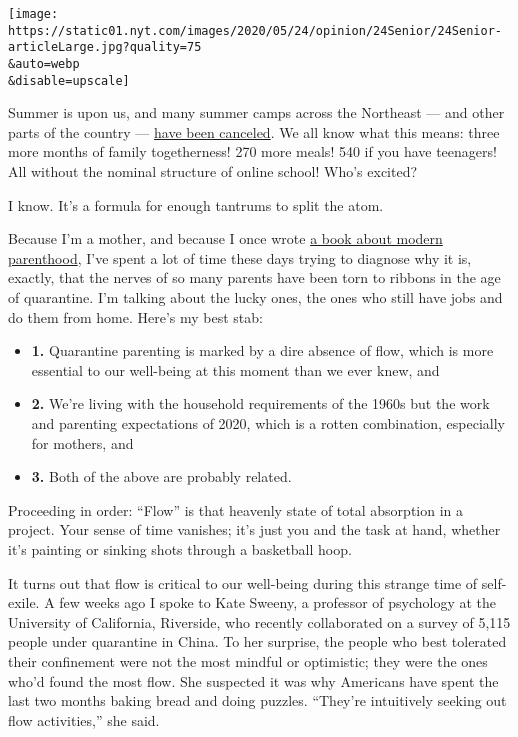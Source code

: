 \texttt{[image: https://static01.nyt.com/images/2020/05/24/opinion/24Senior/24Senior-articleLarge.jpg?quality=75\\\&auto=webp\\\&disable=upscale]}

Summer is upon us, and many summer camps across the Northeast --- and
other parts of the country ---
\href{https://www.nytimes.com/2020/05/22/nyregion/summer-camp-coronavirus.html?searchResultPosition=1}{have
been canceled}. We all know what this means: three more months of family
togetherness! 270 more meals! 540 if you have teenagers! All without the
nominal structure of online school! Who's excited?

I know. It's a formula for enough tantrums to split the atom.

Because I'm a mother, and because I once wrote
\href{https://www.nytimes.com/2014/02/02/books/review/all-joy-and-no-fun-by-jennifer-senior.html}{a
book about modern parenthood}, I've spent a lot of time these days
trying to diagnose why it is, exactly, that the nerves of so many
parents have been torn to ribbons in the age of quarantine. I'm talking
about the lucky ones, the ones who still have jobs and do them from
home. Here's my best stab:

\begin{itemize}
\item
  \textbf{1.} Quarantine parenting is marked by a dire absence of flow,
  which is more essential to our well-being at this moment than we ever
  knew, and
\item
  \textbf{2.} We're living with the household requirements of the 1960s
  but the work and parenting expectations of 2020, which is a rotten
  combination, especially for mothers, and
\item
  \textbf{3.} Both of the above are probably related.
\end{itemize}

Proceeding in order: ``Flow'' is that heavenly state of total absorption
in a project. Your sense of time vanishes; it's just you and the task at
hand, whether it's painting or sinking shots through a basketball hoop.

It turns out that flow is critical to our well-being during this strange
time of self-exile. A few weeks ago I spoke to Kate Sweeny, a professor
of psychology at the University of California, Riverside, who recently
collaborated on a survey of 5,115 people under quarantine in China. To
her surprise, the people who best tolerated their confinement were not
the most mindful or optimistic; they were the ones who'd found the most
flow. She suspected it was why Americans have spent the last two months
baking bread and doing puzzles. ``They're intuitively seeking out flow
activities,'' she said.


